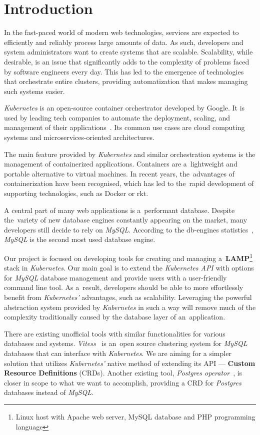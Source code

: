 \chapter{Introduction}
In the fast-paced world of modern web technologies, services are expected to
efficiently and reliably process large amounts of data. As such, developers
and system administrators want to create systems that are scalable. Scalability,
while desirable, is an issue that significantly adds to the complexity of
problems faced by software engineers every day. This has led to the emergence of
technologies that orchestrate entire clusters, providing automatization that
makes managing such systems easier.

\textit{Kubernetes} is an open-source container orchestrator developed by
Google. It is used by leading tech companies to automate the deployment,
scaling, and management of their applications~\cite{kube-usecase}. Its common
use cases are cloud computing systems and microservices-oriented architectures.

The main feature provided by \textit{Kubernetes} and similar orchestration
systems is the management of containerized applications. Containers are
a~lightweight and portable alternative to virtual machines. In recent years,
the~advantages of containerization have been recognised, which has led to
the~rapid development of supporting technologies, such as Docker or rkt.

A central part of many web applications is a~performant database. Despite
the~variety of new database engines constantly appearing on the market, many
developers still decide to rely on \textit{MySQL}. According to the db-engines
statistics~\cite{db-eng}, \textit{MySQL} is the second most used database
engine.

Our project is focused on developing tools for creating and managing
a~\textbf{LAMP}\footnote{Linux host with Apache web server, MySQL database
and PHP programming language} stack in \textit{Kubernetes}. Our main goal is to
extend the \textit{Kubernetes API} with options for \textit{MySQL} database
management and provide users with a user-friendly command line tool. As
a~result, developers should be able to more effortlessly benefit from
\textit{Kubernetes’} advantages, such as scalability. Leveraging the powerful
abstraction system provided by \textit{Kubernetes} in such a way will remove
much of the complexity traditionally caused by the database layer of
an~application.

There are existing unofficial tools with similar functionalities for various
databases and systems. \textit{Vitess}~\cite{vitess} is an~open source
clustering system for \textit{MySQL} databases that can interface with
\textit{Kubernetes}. We are aiming for a simpler solution that utilizes
\textit{Kubernetes'} native method of extending its API ---
\textbf{Custom Resource Definitions} (CRDs). Another existing tool,
\textit{Postgres operator}~\cite{psql-op}, is closer in scope to what we want to
accomplish, providing a CRD for \textit{Postgres} databases instead of
\textit{MySQL}.

